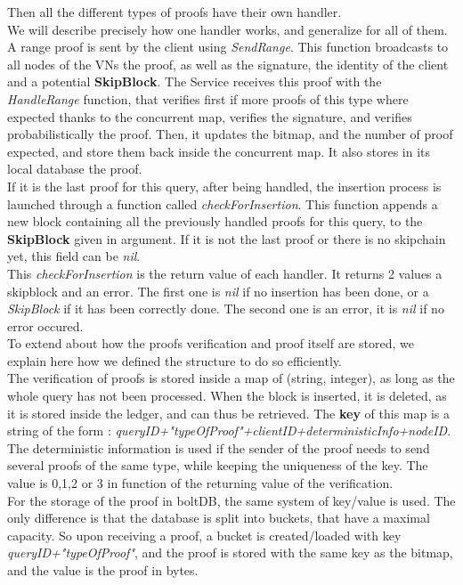 \documentclass{article}
\begin{document}
Then all the different types of proofs have their own handler.\\
We will describe precisely how one handler works, and generalize for all of them.\\

A range proof is sent by the client using \textit{SendRange}. This function broadcasts to all nodes of the VNs the proof, as well as the signature, the identity of the client and a potential \textbf{SkipBlock}.
The Service receives this proof with the \textit{HandleRange} function, that verifies first if more proofs of this type where expected thanks to the concurrent map, verifies the signature, and verifies probabilistically the proof. Then, it updates the bitmap, and the number of proof expected, and store them back inside the concurrent map. It also stores in its local database the proof.\\
If it is the last proof for this query, after being handled, the insertion process is launched through a function called \textit{checkForInsertion}. This function appends a new block containing all the previously handled proofs for this query, to the \textbf{SkipBlock} given in argument. If it is not the last proof or there is no skipchain yet, this field can be \textit{nil}.\\
This \textit{checkForInsertion} is the return value of each handler. It returns 2 values a skipblock and an error. The first one is \textit{nil} if no insertion has been done, or a \textit{SkipBlock} if it has been correctly done. The second one is an error, it is \textit{nil} if no error occured.\\


To extend about how the proofs verification and proof itself are stored, we explain here how we defined the structure to do so efficiently.\\
The verification of proofs is stored inside a map of (string, integer), as long as the whole query has not been processed. When the block is inserted, it is deleted, as it is stored inside the ledger, and can thus be retrieved. The \textbf{key} of this map is a string of the form : \textit{queryID+"typeOfProof"+clientID+deterministicInfo+nodeID}. The deterministic information is used if the sender of the proof needs to send several proofs of the same type, while keeping the uniqueness of the key. The value is 0,1,2 or 3 in function of the returning value of the verification.\\
For the storage of the proof in boltDB, the same system of key/value is used. The only difference is that the database is split into buckets, that have a maximal capacity. So upon receiving a proof, a bucket is created/loaded with key \textit{queryID+"typeOfProof"}, and the proof is stored with the same key as the bitmap, and the value is the proof in bytes.\\
\end{document}
